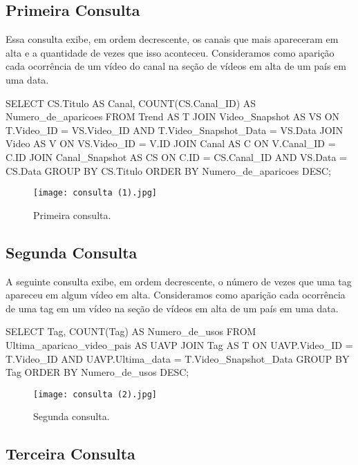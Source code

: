 \subsection{Primeira Consulta}

  Essa consulta exibe, em ordem decrescente, os canais que mais apareceram em alta e a quantidade de vezes que isso aconteceu. Consideramos como aparição cada ocorrência de um vídeo do canal na seção de vídeos em alta de um país em uma data.

  \begin{code}
SELECT CS.Titulo AS Canal, COUNT(CS.Canal_ID) AS Numero_de_aparicoes
FROM Trend AS T JOIN
    Video_Snapshot AS VS ON T.Video_ID = VS.Video_ID AND
                T.Video_Snapshot_Data = VS.Data JOIN
      Video AS V ON VS.Video_ID = V.ID JOIN
        Canal AS C ON V.Canal_ID = C.ID JOIN
          Canal_Snapshot AS CS ON C.ID = CS.Canal_ID AND
                      VS.Data = CS.Data
GROUP BY CS.Titulo
ORDER BY Numero_de_aparicoes DESC;
  \end{code}

  \begin{figure}[H]
    \centering
    \texttt{[image: consulta (1).jpg]}
    \caption{Primeira consulta.}
  \end{figure}

\subsection{Segunda Consulta}

  A seguinte consulta exibe, em ordem decrescente, o número de vezes que uma tag apareceu em algum vídeo em alta. Consideramos como aparição cada ocorrência de uma tag em um vídeo na seção de vídeos em alta de um país em uma data.

  \begin{code}
SELECT Tag, COUNT(Tag) AS Numero_de_usos
FROM Ultima_aparicao_video_pais AS UAVP JOIN
    Tag AS T ON UAVP.Video_ID = T.Video_ID AND
          UAVP.Ultima_data = T.Video_Snapshot_Data
GROUP BY Tag
ORDER BY Numero_de_usos DESC;
  \end{code}

  \begin{figure}[H]
    \centering
    \texttt{[image: consulta (2).jpg]}
    \caption{Segunda consulta.}
  \end{figure}

\subsection{Terceira Consulta}

